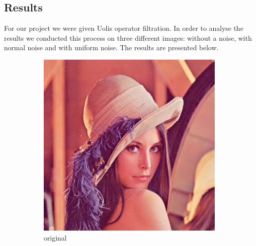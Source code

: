 \documentclass[12pt]{article}
\begin{document}
\subsection{Results}
For our project we were given Uolis operator filtration. In order to analyse the results we conducted this process on three different images: without a noise, with normal noise and with uniform noise. The results are presented below.

\begin{figure}[H]\centering
    \begin{subfigure}[t]{\subfiguresize}\centering
        \includegraphics[width=\textwidth]{lenac.png}
        \caption{original}
    \end{subfigure}
    \hspace{.05\textwidth}
    \begin{subfigure}[t]{\subfiguresize}\centering

\end{subfigure}
\end{figure}
\end{document}
